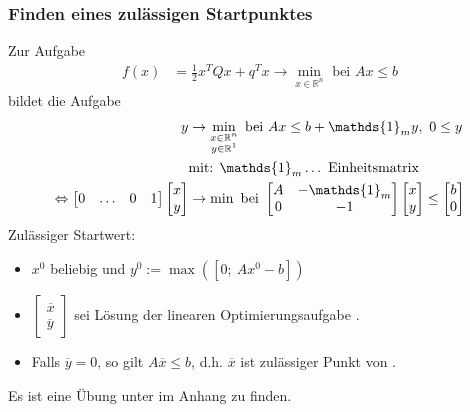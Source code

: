 \subsubsection{Finden eines zulässigen Startpunktes}
Zur Aufgabe 
\begin{align}
	f(x) & =\frac12 x^TQx+q^Tx\rightarrow\min\limits_{x\in\mathbb{R}^n} \text{ bei } Ax\le b \label{eq:startpkt_1}
\end{align} 
bildet die Aufgabe 
\begin{align}
	y & \rightarrow\min\limits_{\substack{x\in\mathbb{R}^n\\y\in\mathbb{R}^1}} \text{ bei } Ax\le b+\mathds{1}_m y,\ 0\le y \label{eq:startpkt_2}\\
	& \text{mit: } \mathds{1}_m\ldots \text{ Einheitsmatrix} \notag\\
	\Leftrightarrow \begin{bmatrix} 0 & \ldots & 0 & 1 \end{bmatrix}\begin{bmatrix} x\\y \end{bmatrix} & \rightarrow\min  \text{ bei } \begin{bmatrix} A & -\mathds{1}_m\\0 & -1
	\end{bmatrix}\begin{bmatrix} x\\y \end{bmatrix}\le \begin{bmatrix} b\\0 \end{bmatrix} \label{eq:startpkt_3}
\end{align}
Zulässiger Startwert:
\begin{itemize}
  \item[] $x^0$ beliebig und $y^0:=\max\left([0;\ Ax^0-b]\right)$
  \item[] $\begin{bmatrix}\overline{x}\\ \overline{y} \end{bmatrix}$ sei Lösung der linearen Optimierungsaufgabe .
  \item[] Falls $\overline{y}=0$, so gilt 
  $A\overline{x}\le b$, d.h. $\overline{x}$ ist zulässiger Punkt von .
\end{itemize}
Es ist eine Übung unter  im Anhang zu finden.


